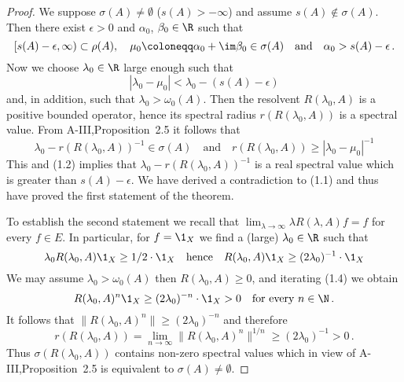 \begin{proof}
	We suppose $\sigma(A) \neq \emptyset$ (\ie $s(A) > -\infty$) and assume $s(A) \notin \sigma(A)$.
	Then there exist $\epsilon > 0$ and $\alpha_{0}$, $\beta_{0} \in \R$ such that
	\begin{equation}\label{eq:b3-1.1}
		[s(A)-\epsilon,\infty) \subset \rho(A), \quad \mu_{0} \coloneqq \alpha_{0} + \im\beta_{0} \in \sigma(A) \quad \text{and} \quad \alpha_{0} > s(A)-\epsilon\,.
	\end{equation}
	Now we choose $\lambda_{0} \in \R$ large enough such that
	\begin{equation}\label{eq:b3-1.2}
		|\lambda_{0} - \mu_{0}| < \lambda_{0} - (s(A) - \epsilon)
	\end{equation}
	and, in addition, such that $\lambda_{0} > \omega_{0}(A)$.
	Then the resolvent $R(\lambda_{0},A)$ is a positive bounded operator, hence its spectral radius $r(R(\lambda_{0},A))$ is a spectral value.
	From A-III,Proposition~2.5 it follows that
	\begin{equation}\label{eq:b3-1.3}
		\lambda_{0} - r(R(\lambda_{0},A))^{-1} \in \sigma(A) \quad \text{and} \quad r(R(\lambda_{0},A)) \geq |\lambda_{0} - \mu_{0}|^{-1}
	\end{equation}
	This and (1.2) implies that $\lambda_{0} - r(R(\lambda_{0},A))^{-1}$ is a real spectral value which is greater than $s(A) - \epsilon$.
	We have derived a contradiction to (1.1) and thus have proved the first statement of the theorem.
	
	To establish the second statement we recall that $\lim_{\lambda \to \infty}\lambda R(\lambda,A)f = f$ for every $f \in E$.
	In particular, for $f = \1_{X}$ we find a (large) $\lambda_{0} \in \R$ such that
	\begin{equation}\label{eq:b3-1.4}
		\lambda_{0}R(\lambda_{0},A)\1_{X} \geq 1/2\cdot\1_{X} \quad \text{hence} \quad R(\lambda_{0},A)\1_{X} \geq (2\lambda_{0})^{-1}\cdot\1_{X}
	\end{equation}
	We may assume $\lambda_{0} > \omega_{0}(A)$ then $R(\lambda_{0},A) \geq 0$, and iterating (1.4) we obtain
	\begin{equation}\label{eq:b3-1.5}
		R(\lambda_{0},A)^{n}\1_{X} \geq (2\lambda_{0})^{-n}\cdot\1_{X} > 0 \quad \text{for every } n \in \N\,.
	\end{equation}
	It follows that $\|R(\lambda_{0},A)^{n}\| \geq (2\lambda_{0})^{-n}$ and therefore
	\begin{equation}\label{eq:b3-1.6}
		r(R(\lambda_{0},A)) = \lim_{n \to \infty}\|R(\lambda_{0},A)^{n}\|^{1/n} \geq (2\lambda_{0})^{-1} > 0\,.
	\end{equation}
	Thus $\sigma(R(\lambda_{0},A))$ contains non-zero spectral values which in view of A-III,Proposition~2.5 is equivalent to $\sigma(A) \neq \emptyset$.
\end{proof}
